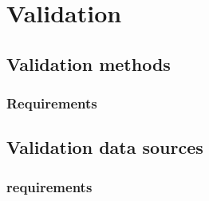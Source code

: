 \chapter{Validation}

\section{Validation methods}
\subsection{Requirements}

\section{Validation data sources}
\subsection{requirements}

